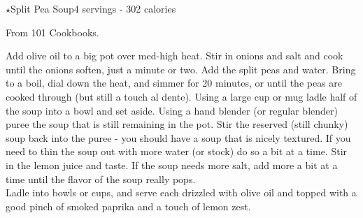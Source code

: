 \begin{recipe}{$\star$Split Pea Soup}{4 servings - 302 calories}{}

\freeform From 101 Cookbooks.


Add olive oil to a big pot over med-high heat. Stir in onions and salt and cook until the onions soften, just a minute or two. Add the split peas and water. Bring to a boil, dial down the heat, and simmer for 20 minutes, or until the peas are cooked through (but still a touch al dente). Using a large cup or mug ladle half of the soup into a bowl and set aside. Using a hand blender (or regular blender) puree the soup that is still remaining in the pot. Stir the reserved (still chunky) soup back into the puree - you should have a soup that is nicely textured. If you need to thin the soup out with more water (or stock) do so a bit at a time. Stir in the lemon juice and taste. If the soup needs more salt, add more a bit at a time until the flavor of the soup really pops.\\

Ladle into bowls or cups, and serve each drizzled with olive oil and topped with a good pinch of smoked paprika and a touch of lemon zest.
\end{recipe}